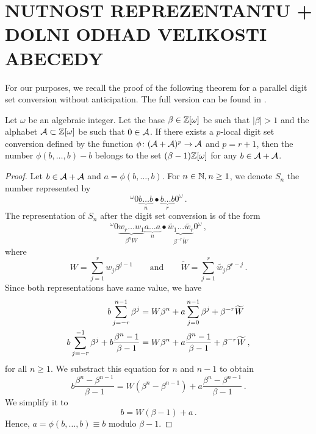 
\section{NUTNOST REPREZENTANTU + DOLNI ODHAD VELIKOSTI ABECEDY}



For our purposes, we recall the proof of the following theorem for a parallel digit set conversion without anticipation. The full version can be found in \cite{minAlph}.
\begin{thm}
\label{thm:reprBetaMinusOne}
Let $\omega$ be an algebraic integer. Let the base $\beta\in\mathbb{Z}[\omega]$ be such that $|\beta|>1$ and the alphabet $\mathcal{A}\subset\mathbb{Z}[\omega]$ be such that $0\in\mathcal{A}$. If there exists a $p$-local digit set conversion defined by the function $\phi\colon (\mathcal{A}+\mathcal{A})^p\rightarrow \mathcal{A}$ and $p=r+1$, then the number $\phi(b,\dots,b)-b$ belongs to the set $(\beta-1)\mathbb{Z}[\omega]$ for any $b\in\mathcal{A}+\mathcal{A}$. 
\end{thm}
\begin{proof}
Let $b\in\mathcal{A}+\mathcal{A}$ and $a=\phi(b, \dots,b)$. For $n\in\mathbb{N}, n\geq 1$, we denote $S_n$ the number represented by
$$
^{\omega}\!0 \underbrace{b\dots b}_{n}\bullet \underbrace{b\dots b}_{r}0^\omega\,.
$$
The representation of $S_n$ after the digit set conversion is of the form
$$
^{\omega}\!0 \underbrace{w_{r}\dots w_{1}}_{\beta^n W}\underbrace{a\dots a}_{n}\bullet \underbrace{\widetilde{w_1}\dots \widetilde{w_r}}_{\beta^{-r}\widetilde{W}}0^\omega\,,
$$
where 
$$W=\sum_{j=1}^r w_j \beta^{j-1} \qquad \text{and} \qquad \widetilde{W}=\sum_{j=1}^r\widetilde{w_j} \beta^{r-j}\,.$$
Since both representations have same value, we have
\begin{align}
\label{eq:reprBetaMinusOne}
b \sum_{j=-r}^{n-1} \beta^j &= W \beta^n + a \sum_{j=0}^{n-1} \beta^j + \beta^{-r}\widetilde{W} \notag \\
b \sum_{j=-r}^{-1} \beta^j +b\frac{\beta^n-1}{\beta-1} &= W \beta^n + a \frac{\beta^n-1}{\beta-1} + \beta^{-r}\widetilde{W}\,,
\end{align}
for all $n\geq 1$. We substract this equation for $n$ and $n-1$ to obtain
$$
b\frac{\beta^n-\beta^{n-1}}{\beta-1}=W(\beta^n-\beta^{n-1}) + a\frac{\beta^n-\beta^{n-1}}{\beta-1}\,.
$$
We simplify it to
\begin{equation}
\label{eq:reprBetaMinusOneFinal}
b=W(\beta-1) + a\,.
\end{equation}
Hence, $a=\phi(b, \dots,b)\equiv b$ modulo $\beta-1$.
\end{proof}

